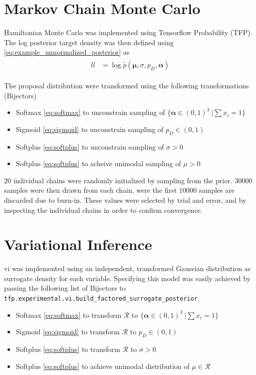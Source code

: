 \section{Markov Chain Monte Carlo}
Hamiltonian Monte Carlo was implemented using Tensorflow Probability (TFP). The log posterior target density was then defined using \cref{eq:example_unnormalized_posterior} as 
\begin{align}\label{eq:example_ll}
\begin{split}
    ll &= \log \tilde{p}(\boldsymbol{\mu}, \sigma, p_D, \boldsymbol{\alpha})
\end{split}
\end{align}


The proposal distribution were transformed using the following transformations (Bijectors)

\begin{itemize}
\item Softmax \eqref{eq:softmax} to unconstrain sampling of $\{\boldsymbol{\alpha} \in (0, 1)^3\ | \sum x_i = 1\}$
\item Sigmoid \eqref{eq:sigmoid} to unconstrain sampling of $p_D \in (0, 1)$
\item Softplus \eqref{eq:softplus} to unconstrain sampling of $\sigma > 0$
\item Softplus \eqref{eq:softplus} to acheive unimodal sampling of $\mu > 0$
\end{itemize}

$20$ individual chains were randomly initialized by sampling from the prior. $30000$ samples were then drawn from each chain, were the first $10000$ samples are discarded due to burn-in. These values were selected by trial and error, and by inspecting the individual chains in order to confirm convergence.  

\section{Variational Inference}

\acrshort{vi} was implemented using an independent, transformed Gaussian distribution as surrogate density for each variable. Specifying this model was easily achieved by passing the following list of Bijectors to \texttt{tfp.experimental.vi.build\_factored\_surrogate\_posterior}.
\begin{itemize}
\item Softmax \eqref{eq:softmax} to transform $\mathcal{R}$ to $\{\boldsymbol{\alpha} \in (0, 1)^3\ | \sum x_i = 1\}$
\item Sigmoid \eqref{eq:sigmoid} to transform $\mathcal{R}$ to $p_D \in (0, 1)$
\item Softplus \eqref{eq:softplus} to transform $\mathcal{R}$ to $\sigma > 0$
\item Softplus \eqref{eq:softplus} to achieve unimodal distribution of $\mu \in \mathcal{R}$
\end{itemize}

